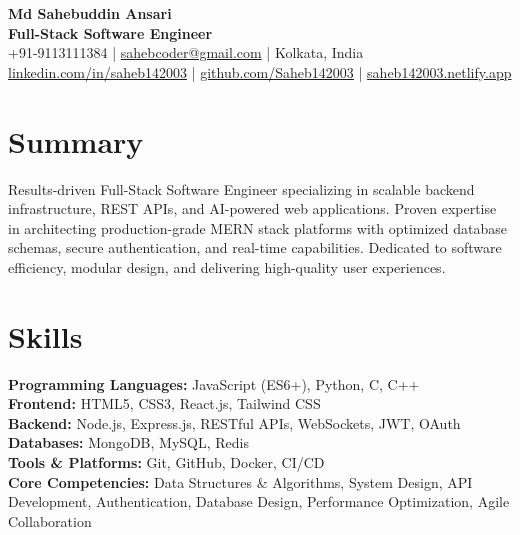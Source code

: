 \documentclass[a4paper,10pt]{article}
\begin{document}
\begin{center}
{\Large \textbf{Md Sahebuddin Ansari}}\\
\vspace{2pt}
{\large \textbf{Full-Stack Software Engineer}} \\
\vspace{2pt}
+91-9113111384 \quad|\quad
\href{mailto:sahebcoder@gmail.com}{sahebcoder@gmail.com} \quad|\quad
Kolkata, India \\
\vspace{2pt}
\href{https://linkedin.com/in/saheb142003}{linkedin.com/in/saheb142003} \quad|\quad
\href{https://github.com/Saheb142003}{github.com/Saheb142003} \quad|\quad
\href{https://saheb142003.netlify.app}{saheb142003.netlify.app}
\end{center}

\vspace{-5pt}
\section*{Summary}
Results-driven Full-Stack Software Engineer specializing in scalable backend infrastructure, REST APIs, and AI-powered web applications. Proven expertise in architecting production-grade MERN stack platforms with optimized database schemas, secure authentication, and real-time capabilities. Dedicated to software efficiency, modular design, and delivering high-quality user experiences.

\section*{Skills}
\textbf{Programming Languages:} JavaScript (ES6+), Python, C, C++ \\
\textbf{Frontend:} HTML5, CSS3, React.js, Tailwind CSS \\
\textbf{Backend:} Node.js, Express.js, RESTful APIs, WebSockets, JWT, OAuth \\
\textbf{Databases:} MongoDB, MySQL, Redis \\
\textbf{Tools \& Platforms:} Git, GitHub, Docker, CI/CD \\
\textbf{Core Competencies:} Data Structures \& Algorithms, System Design, API Development, Authentication, Database Design, Performance Optimization, Agile Collaboration

\end{document}

